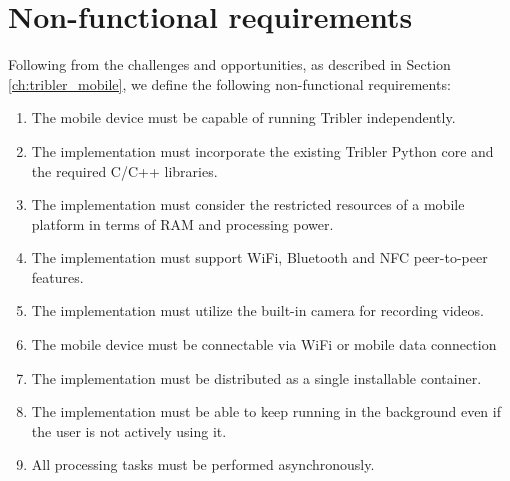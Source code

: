 \section{Non-functional requirements}\label{sec:non_func_req}

Following from the challenges and opportunities, as described in Section \ref{ch:tribler_mobile}, we define the following non-functional requirements:

\begin{enumerate}[label=B\arabic*.,ref=B\arabic*]
	
	\item \label{rq:Independence} The mobile device must be capable of running Tribler independently.
	\item \label{rq:PythonClibs} The implementation must incorporate the existing Tribler Python core and the required C/C++ libraries.
	\item \label{rq:LimitedResources} The implementation must consider the restricted resources of a mobile platform in terms of RAM and processing power.
	\item \label{rq:P2P} The implementation must support WiFi, Bluetooth and NFC peer-to-peer features.
	\item \label{rq:BuiltinCam} The implementation must utilize the built-in camera for recording videos.
	\item\label{rq:Connectible}  The mobile device must be connectable via WiFi or mobile data connection
	\item \label{rq:DistSingleApk} The implementation must be distributed as a single installable container.
	\item \label{rq:Service} The implementation must be able to keep running in the background even if the user is not actively using it.
	\item \label{rq:Async} All processing tasks must be performed asynchronously.

\end{enumerate}

